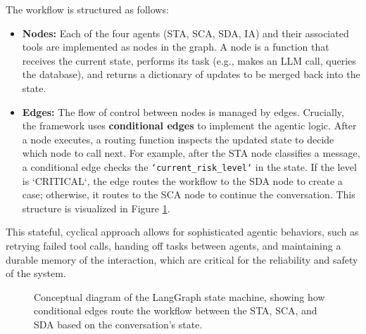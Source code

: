 The workflow is structured as follows:
\begin{itemize}
    \item \textbf{Nodes:} Each of the four agents (STA, SCA, SDA, IA) and their associated tools are implemented as nodes in the graph. A node is a function that receives the current state, performs its task (e.g., makes an LLM call, queries the database), and returns a dictionary of updates to be merged back into the state.
    \item \textbf{Edges:} The flow of control between nodes is managed by edges. Crucially, the framework uses \textbf{conditional edges} to implement the agentic logic. After a node executes, a routing function inspects the updated state to decide which node to call next. For example, after the STA node classifies a message, a conditional edge checks the \texttt{`current\_risk\_level`} in the state. If the level is `CRITICAL`, the edge routes the workflow to the SDA node to create a case; otherwise, it routes to the SCA node to continue the conversation. This structure is visualized in Figure \ref{fig:langgraph_conceptual}.
\end{itemize}

This stateful, cyclical approach allows for sophisticated agentic behaviors, such as retrying failed tool calls, handing off tasks between agents, and maintaining a durable memory of the interaction, which are critical for the reliability and safety of the system.

\begin{figure}[h]
    \centering
    \caption{Conceptual diagram of the LangGraph state machine, showing how conditional edges route the workflow between the STA, SCA, and SDA based on the conversation's state.}
    \label{fig:langgraph_conceptual}
\end{figure}

